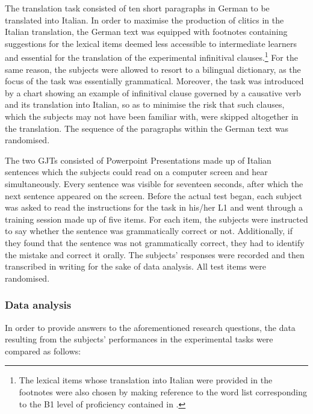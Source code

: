 \documentclass[output=paper,modfonts,nonflat,newtxmath]{langsci/langscibook}
\begin{document}
The translation task consisted of ten short paragraphs in German to be translated into Italian. In order to maximise the production of clitics in the Italian translation, the German text was equipped with footnotes containing suggestions for the lexical items deemed less accessible to intermediate learners and essential for the translation of the experimental infinitival clauses.\footnote{ \textrm{The lexical items whose translation into Italian were provided in the footnotes were also chosen by making reference to the word list corresponding to the B1 level of proficiency contained in \citet{SpinelliParizzi2010}.}} For the same reason, the subjects were allowed to resort to a bilingual dictionary, as the focus of the task was essentially grammatical. Moreover, the task was introduced by a chart showing an example of infinitival clause governed by a causative verb and its translation into Italian, so as to minimise the risk that such clauses, which the subjects may not have been familiar with, were skipped altogether in the translation. The sequence of the paragraphs within the German text was randomised.


The two GJTs consisted of Powerpoint Presentations made up of Italian sentences which the subjects could read on a computer screen and hear simultaneously. Every sentence was visible for seventeen seconds, after which the next sentence appeared on the screen. Before the actual test began, each subject was asked to read the instructions for the task in his/her L1 and went through a training session made up of five items. For each item, the subjects were instructed to say whether the sentence was grammatically correct or not. Additionally, if they found that the sentence was not grammatically correct, they had to identify the mistake and correct it orally. The subjects’ responses were recorded and then transcribed in writing for the sake of data analysis. All test items were randomised.

  \subsubsection{Data analysis} %

In order to provide answers to the aforementioned research questions, the data resulting from the subjects’ performances in the experimental tasks were compared as follows:
\end{document}
